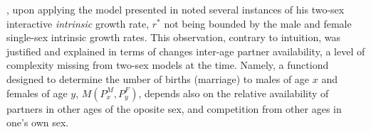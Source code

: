 
\citet{gupta1973}, upon applying the model presented in \citep{gupta1972two}
noted several instances of his two-sex interactive \textit{intrinsic} growth
rate, $r^\ast$ not being bounded by the male and female single-sex intrinsic
growth rates. This observation, contrary to intuition, was justified and
explained in terms of changes inter-age partner availability, a level of
complexity missing from two-sex models at the time. Namely, a functiond designed
to determine the umber of births (marriage) to males of age $x$ and females of
age $y$, $M(P_x^M, P_y^F)$, depends also on the relative availability of
partners in other ages of the oposite sex, and competition from other ages in
one's own sex.


